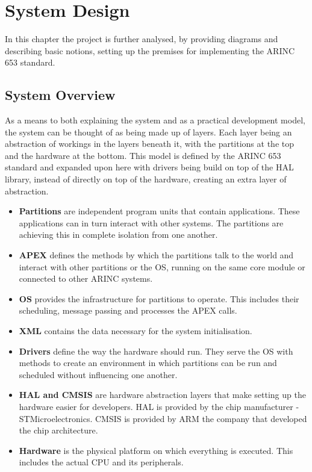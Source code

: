 \chapter{System Design}

In this chapter the project is further analysed, by providing diagrams 
and describing basic notions, setting up the premises for implementing
the ARINC 653 standard.

\section{System Overview}
As a means to both explaining the system and as a practical development
model, the system can be thought of as being made up of layers.
Each layer being an abstraction of workings in the layers beneath it,
with the partitions at the top and the hardware at the bottom.
This model is defined by the ARINC 653 standard
and expanded upon here with drivers being build on top of the HAL library,
instead of directly on top of the hardware,
creating an extra layer of abstraction.

\begin{itemize}
	\item \textbf{Partitions}
		are independent program units that contain applications. These
		applications can in turn interact with other systems. The
		partitions are achieving this  in complete isolation from 
		one another.
	\item \textbf{APEX}
		defines the methods by which the partitions talk to the world and
		interact with other partitions or the OS, running
		on the same core module or connected to other ARINC systems.
	\item \textbf{OS}
		provides the infrastructure for partitions to operate. This 
		includes their scheduling, message passing and processes 
		the APEX calls.
	\item \textbf{XML}
		contains the data necessary for the system initialisation.
	\item \textbf{Drivers}
		define the way the hardware should run.	
		They serve the OS with methods to create an environment in which
		partitions can be run and scheduled without influencing one
		another.
	\item \textbf{HAL and CMSIS}
		are hardware abstraction layers that make setting up the hardware
		easier for developers. HAL is provided by the chip manufacturer - 
		STMicroelectronics. CMSIS is provided by ARM the company that
		developed the chip architecture.
	\item \textbf{Hardware}
		is the physical platform on which everything is executed. This 
		includes the actual CPU and its peripherals.
\end{itemize}

